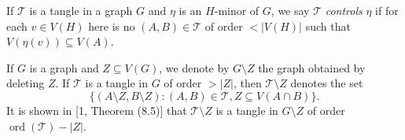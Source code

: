 If $\mathscr{T}$ is a tangle in a graph $G$ and $\eta$ is an $H$-minor of $G$, we say $\mathscr{T}$ \textit{controls} $\eta$ if for each $v \in V(H)$ here is no $(A, B) \in \mathscr{T}$ of order $< |V(H)|$ such that $V(\eta(v)) \subseteq V(A)$.

If $G$ is a graph and $Z \subseteq V(G)$, we denote by $G \setminus Z$ the graph obtained by deleting $Z$. If $\mathscr{T}$ is a tangle in $G$ of order $> |Z|$, then $\mathscr{T} \setminus Z$ denotes the set
\begin{equation*}
\{(A \setminus Z, B \setminus Z) \colon (A, B) \in \mathscr{T}, Z \subseteq V(A \cap B)\}.
\end{equation*}
It is shown in [1, Theorem (8.5)] that $\mathscr{T} \setminus Z$ is a tangle in $G \setminus Z$ of order $\operatorname{ord}(\mathscr{T}) - |Z|.$
